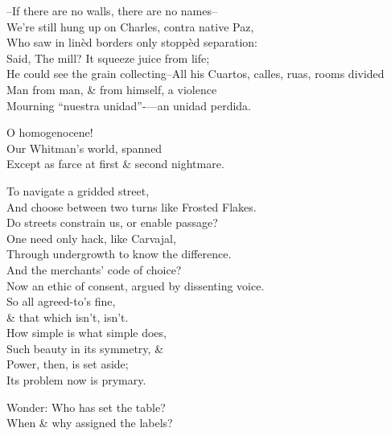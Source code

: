 --If there are no walls, there are no names-- \\
We're still hung up on Charles, contra native Paz, \\
Who saw in linèd borders only stoppèd separation: \\
Said, The mill? It squeeze juice from life; \\
He could see the grain collecting--All his
Cuartos, calles, ruas, rooms divided \\
Man from man, \& from himself, a violence \\
Mourning ``nuestra unidad''-—an unidad perdida.

O homogenocene! \\
Our Whitman's world, spanned \\
Except as farce at first \& second nightmare.

To navigate a gridded street, \\
And choose between two turns like Frosted Flakes. \\
Do streets constrain us, or enable passage? \\
One need only hack, like Carvajal, \\
Through undergrowth to know the difference. \\
And the merchants' code of choice? \\
Now an ethic of consent, argued by dissenting voice. \\

So all agreed-to's fine, \\
\qquad \& that which isn't, isn't. \\
How simple is what simple does, \\
Such beauty in its symmetry, \& \\
Power, then, is set aside; \\
Its problem now is prymary.

Wonder: Who has set the table? \\
When \& why assigned the labels?
